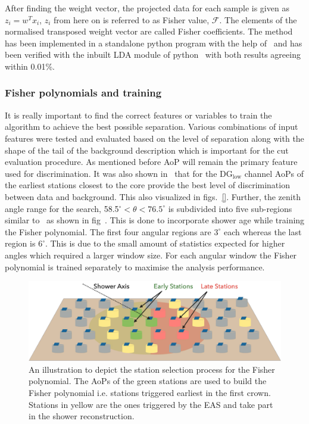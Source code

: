 After finding the weight vector, the projected data for each sample is given as $z_i = w^Tx_i$, $z_i$ from here on is referred to as Fisher value, $\mathcal{F}$. The elements of the normalised transposed weight vector are called Fisher coefficients. The method has been implemented in a standalone python program with the help of~\cite{JaimeAlvarezMuniz_conversation} and has been verified with the inbuilt LDA module of python~\cite{scikit_Learn} with both results agreeing within 0.01\%. 

\subsubsection{Fisher polynomials and training}
\label{subsubsec:nu_sel_fisher_training}
It is really important to find the correct features or variables to train the algorithm to achieve the best possible separation. Various combinations of input features were tested and evaluated based on the level of separation along with the shape of the tail of the background description which is important for the cut evaluation procedure. As mentioned before AoP will remain the primary feature used for discrimination. It was also shown in~\cite{gap_note_2013} that for the DG$\mathrm{_{low}}$ channel AoPs of the earliest stations closest to the core provide the best level of discrimination between data and background. This also visualized in figs.~\ref{}. Further, the zenith angle range for the search, 58.5$^\circ < \theta < 76.5^\circ$ is subdivided into five sub-regions similar to~\cite{gap_note_2013} as shown in fig~\cite{}. This is done to incorporate shower age while training the Fisher polynomial. The first four angular regions are $3^\circ$ each whereas the last region is $6^\circ$. This is due to the small amount of statistics expected for higher angles which required a larger window size. For each angular window the Fisher polynomial is trained separately to maximise the analysis performance. 

\begin{figure}[h!]
  \centering
  \includegraphics[width=\textwidth]{thesis_figures/Nu_analysis/Fisher_early_late.pdf}
  \caption{An illustration to depict the station selection process for the Fisher polynomial. The AoPs of the green stations are used to build the Fisher polynomial i.e. stations triggered earliest in the first crown. Stations in yellow are the ones triggered by the EAS and take part in the shower reconstruction.}
  \label{fig:AoP_early_late}
\end{figure}

